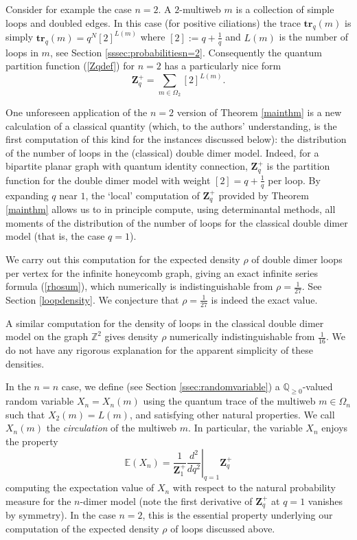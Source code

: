 \documentclass[12pt, reqno]{amsart}
\theoremstyle{definition}
\newcommand{\Zq}{\mathbf{Z}_q}%
\newcommand{\E}{\mathbb{E}}%
\newcommand{\Z}{\mathbb{Z}}%
\newcommand{\trq}{\mathbf{tr}_q}%
\begin{document}
Consider for example the case $n=2$. A $2$-multiweb $m$ is a collection of simple loops and doubled edges.   In this case   (for positive ciliations) the trace $\trq(m)$ is simply $\trq(m)=q^N[2]^{L(m)}$ where $[2]:=q+\frac1q$ and $L(m)$ is the  number of loops in $m$, see Section \ref{sssec:probabilitiesn=2}. Consequently the quantum partition function (\ref{Zqdef}) for $n=2$ has a particularly nice form
$$
\Zq^+=\sum_{m\in\Omega_2} [2]^{L(m)}.
$$

One unforeseen application of the $n=2$ version of Theorem \ref{mainthm} is a new calculation of a classical quantity (which, to the authors' understanding, is the first computation of this kind for the instances discussed below):  the distribution of the number of  loops in the (classical) double dimer model. Indeed, for a bipartite planar graph with quantum identity connection, $\Zq^+$ is the partition function for the double dimer model with weight $[2]=q+\frac1q$ per loop.  By expanding $q$ near $1$, the `local' computation of $\Zq^+$ provided by Theorem \ref{mainthm} allows us to  in principle compute, using determinantal methods,  all moments of the distribution of the number of loops for the classical double dimer model (that is, the case $q=1$). 

We carry out this computation for the expected density $\rho$ of double dimer loops per vertex for the infinite honeycomb graph, giving an exact infinite series formula (\ref{rhosum}), which numerically is indistinguishable from $\rho=\frac1{27}$.  See Section \ref{loopdensity}. We conjecture that $\rho=\frac1{27}$ is indeed the exact value. 

A similar computation for the density of loops in the classical double dimer model on the graph $\Z^2$ gives density $\rho$ numerically indistinguishable from $\frac{1}{16}$.  We do not have any rigorous explanation for the apparent simplicity of these densities.

In the $n=n$ case, we define (see Section \ref{ssec:randomvariable}) a $\mathbb{Q}_{\geq0}$-valued random variable $X_n=X_n(m)$ using the quantum trace of the multiweb $m\in\Omega_n$ such that $X_2(m)=L(m)$, and satisfying other natural properties.  We call $X_n(m)$ the \emph{circulation} of the multiweb $m$.  In particular, the variable $X_n$ enjoys the property 
$$
\E(X_n)=\frac{1}{\mathbf{Z}_1^+}\left.\frac{d^2}{dq^2}\right|_{q=1}\Zq^+
$$
computing the expectation value of $X_n$ with respect to the natural probability measure for the $n$-dimer model (note the first derivative of $\Zq^+$ at $q=1$ vanishes by symmetry).  In the case $n=2$, this is the essential property underlying our computation of the expected density $\rho$ of loops discussed above.  
\end{document}
